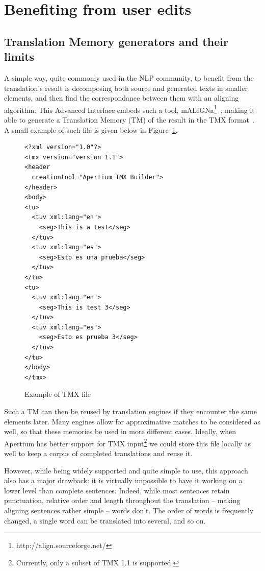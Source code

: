 \documentclass[11pt]{article}
\begin{document}
\section{Benefiting from user edits}

\subsection{Translation Memory generators and their limits}

A simple way, quite commonly used in the NLP community, to benefit from 
the translation's result is decomposing both source and generated texts 
in smaller elements, and then find the correspondance between them with 
an aligning algorithm. 
This Advanced Interface embeds such a tool, 
mALIGNa\footnote{http://align.sourceforge.net/}~\citep{Lipski08}, 
making it able to generate a Translation Memory (TM) of the 
result in the TMX format~\citep{tmx05}. 
A small example of such file is given below in Figure~\ref{TMXSample}.

\begin{figure}[!ht]
\caption{\label{TMXSample} Example of TMX file}
\begin{small}
\begin{verbatim}
<?xml version="1.0"?>
<tmx version="version 1.1">
<header 
  creationtool="Apertium TMX Builder">
</header>
<body>
<tu>
  <tuv xml:lang="en">
    <seg>This is a test</seg>
  </tuv>
  <tuv xml:lang="es">
    <seg>Esto es una prueba</seg>
  </tuv>
</tu>
<tu>
  <tuv xml:lang="en">
    <seg>This is test 3</seg>
  </tuv>
  <tuv xml:lang="es">
    <seg>Esto es prueba 3</seg>
  </tuv>
</tu>
</body>
</tmx>
\end{verbatim}
\end{small}
\end{figure}

Such a TM can then be reused by translation engines if they encounter 
the same elements later. 
Many engines allow for approximative matches to be considered as well, 
so that these memories be used in more different cases. 
Ideally, when Apertium has better support for TMX 
input\footnote{Currently, only a subset of TMX 1.1 is supported.} 
we could store 
this file locally as well to keep a corpus of completed translations 
and reuse it.

However, while being widely supported and quite simple to use, this 
approach also has a major drawback: it is virtually impossible to have 
it working on a lower level than complete sentences. 
Indeed, while most sentences retain punctuation, relative order and 
length throughout the translation -- making aligning sentences rather 
simple -- words don't. 
The order of words is frequently changed, a single word can be translated 
into several, and so on.
\end{document}
